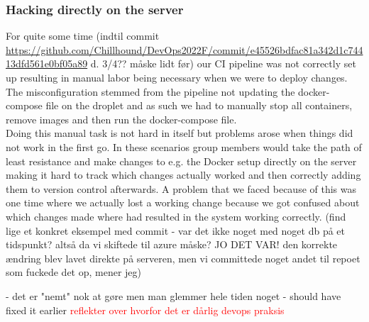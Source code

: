 \subsubsection{Hacking directly on the server}
For quite some time (indtil commit \url{https://github.com/Chillhound/DevOps2022F/commit/e45526bdfac81a342d1c74413dfd561e0bf05a89} d. 3/4?? måske lidt før) our CI pipeline was not correctly set up resulting in manual labor being necessary when we were to deploy changes. The misconfiguration stemmed from 
the pipeline not updating the docker-compose file on the droplet and as such we had to manually stop all containers, remove images and then run the docker-compose file. \\
Doing this manual task is not hard in itself but problems arose when things did not work in the first go. In these scenarios group members would take the path of least resistance and make changes to e.g. the Docker setup directly on the server making it hard to track which changes actually worked and then correctly adding them to version control afterwards. A problem that we faced because of this was one time where we actually lost a working change because we got confused about which changes made where had resulted in the system working correctly. (find lige et konkret eksempel med commit - var det ikke noget med noget db på et tidspunkt? altså da vi skiftede til azure måske? JO DET VAR! den korrekte ændring blev lavet direkte på serveren, men vi committede noget andet til repoet som fuckede det op, mener jeg)

- det er "nemt" nok at gøre men man glemmer hele tiden noget
- should have fixed it earlier 
\textcolor{red}{reflekter over hvorfor det er dårlig devops praksis}

